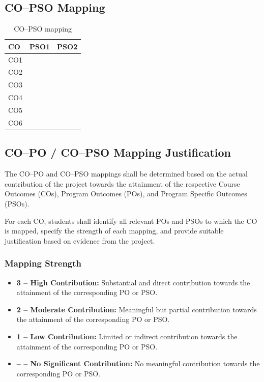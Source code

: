 \subsection{CO--PSO Mapping}

\begin{table}[H]
\centering
\caption{CO--PSO mapping}
\label{tab:co-pso}
\small
\renewcommand{\arraystretch}{1.8}
\begin{tabular}{@{}lcc@{}}
\toprule
\textbf{CO} & \textbf{PSO1} & \textbf{PSO2} \\
\midrule
CO1 & & \\
CO2 & & \\
CO3 & & \\
CO4 & & \\
CO5 & & \\
CO6 & & \\
\bottomrule
\end{tabular}
\end{table}

\subsection{CO--PO / CO--PSO Mapping Justification}

The CO--PO and CO--PSO mappings shall be determined based on the
actual contribution of the project towards the attainment of the
respective Course Outcomes (COs), Program Outcomes (POs), and
Program Specific Outcomes (PSOs).

For each CO, students shall identify all relevant POs and PSOs to
which the CO is mapped, specify the strength of each mapping, and
provide suitable justification based on evidence from the project.

\subsubsection*{Mapping Strength}

\begin{itemize}
    \item \textbf{3 -- High Contribution:} Substantial and direct
    contribution towards the attainment of the corresponding PO or PSO.

    \item \textbf{2 -- Moderate Contribution:} Meaningful but partial
    contribution towards the attainment of the corresponding PO or PSO.

    \item \textbf{1 -- Low Contribution:} Limited or indirect
    contribution towards the attainment of the corresponding PO or PSO.

    \item \textbf{-- -- No Significant Contribution:} No meaningful
    contribution towards the corresponding PO or PSO.
\end{itemize}

